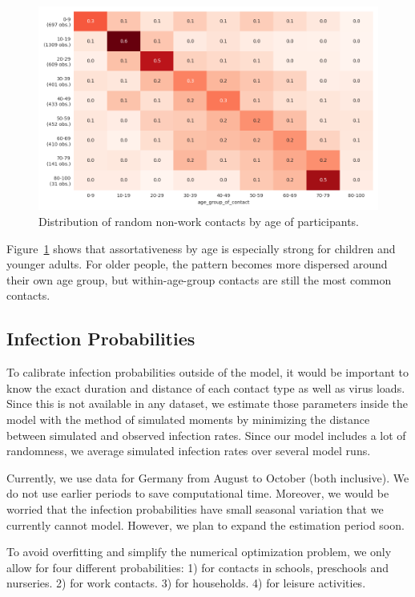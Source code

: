 
\begin{figure}[!tp]
    \centering
    \includegraphics[width=\textwidth]{../figures/assortative_matching_probability_example.png}
    \caption{Distribution of random non-work contacts by age of participants.}
    \label{fig:assortativeness}
\end{figure}

Figure~\ref{fig:assortativeness} shows that assortativeness by age is especially strong
for children and younger adults. For older people, the pattern becomes more dispersed
around their own age group, but within-age-group contacts are still the most common
contacts.


\subsection{Infection Probabilities}
\label{sec:estimation}

To calibrate infection probabilities outside of the model, it would be important to know
the exact duration and distance of each contact type as well as virus loads. Since this
is not available in any dataset, we estimate those parameters inside the model with the
method of simulated moments \citep{McFadden1989} by minimizing the distance between
simulated and observed infection rates. Since our model includes a lot of randomness, we
average simulated infection rates over several model runs.

Currently, we use data for Germany from August to October (both inclusive). We do not
use earlier periods to save computational time. Moreover, we would be worried that the
infection probabilities have small seasonal variation that we currently cannot model.
However, we plan to expand the estimation period soon.

To avoid overfitting and simplify the numerical optimization problem, we only allow for
four different probabilities: 1) for contacts in schools, preschools and nurseries. 2)
for work contacts. 3) for households. 4) for leisure activities.
